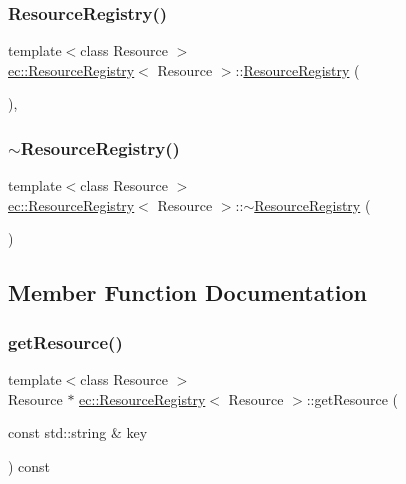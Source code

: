 \subsubsection{\texorpdfstring{Resource\+Registry()}{ResourceRegistry()}}
{\footnotesize\ttfamily template$<$class Resource $>$ \\
\mbox{\hyperlink{classec_1_1_resource_registry}{ec\+::\+Resource\+Registry}}$<$ Resource $>$\+::\mbox{\hyperlink{classec_1_1_resource_registry}{Resource\+Registry}} (\begin{DoxyParamCaption}{ }\end{DoxyParamCaption})\hspace{0.3cm}{\ttfamily [explicit]}, {\ttfamily [default]}}

\mbox{\label{classec_1_1_resource_registry_aa3153d0d76d45905833bafab53341731}} 
\subsubsection{\texorpdfstring{$\sim$\+Resource\+Registry()}{~ResourceRegistry()}}
{\footnotesize\ttfamily template$<$class Resource $>$ \\
\mbox{\hyperlink{classec_1_1_resource_registry}{ec\+::\+Resource\+Registry}}$<$ Resource $>$\+::$\sim$\mbox{\hyperlink{classec_1_1_resource_registry}{Resource\+Registry}} (\begin{DoxyParamCaption}{ }\end{DoxyParamCaption})\hspace{0.3cm}{\ttfamily [default]}}



\subsection{Member Function Documentation}
\mbox{\label{classec_1_1_resource_registry_a2901efec7bcd829a007b041bd5ad2c1f}} 
\subsubsection{\texorpdfstring{get\+Resource()}{getResource()}}
{\footnotesize\ttfamily template$<$class Resource $>$ \\
Resource $\ast$ \mbox{\hyperlink{classec_1_1_resource_registry}{ec\+::\+Resource\+Registry}}$<$ Resource $>$\+::get\+Resource (\begin{DoxyParamCaption}\item[{const std\+::string \&}]{key }\end{DoxyParamCaption}) const}

